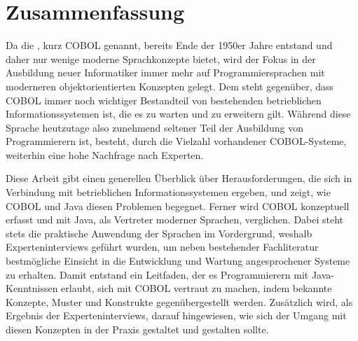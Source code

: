 \chapter*{Zusammenfassung} 

Da die , kurz \mbox{COBOL} genannt, bereits Ende der 1950er Jahre entstand und daher nur wenige moderne Sprachkonzepte bietet, wird der Fokus in der Ausbildung neuer Informatiker immer mehr auf Programmiersprachen mit moderneren objektorientierten Konzepten gelegt. Dem steht gegenüber, dass COBOL immer noch wichtiger Bestandteil von bestehenden betrieblichen Informationssystemen ist, die es zu warten und zu erweitern gilt. Während diese Sprache heutzutage also zunehmend seltener Teil der Ausbildung von Programmierern ist, besteht, durch die Vielzahl vorhandener COBOL-Systeme, weiterhin eine hohe Nachfrage nach Experten.

Diese Arbeit gibt einen generellen Überblick über Herausforderungen, die sich in Verbindung mit betrieblichen Informationssystemen ergeben, und zeigt, wie COBOL und Java diesen Problemen begegnet. Ferner wird COBOL konzeptuell erfasst und mit Java, als Vertreter moderner Sprachen, verglichen. Dabei steht stets die praktische Anwendung der Sprachen im Vordergrund, weshalb Experteninterviews geführt wurden, um neben bestehender Fachliteratur bestmögliche Einsicht in die Entwicklung und Wartung angesprochener Systeme zu erhalten. Damit entstand ein Leitfaden, der es Programmierern mit Java-Kenntnissen erlaubt, sich mit COBOL vertraut zu machen, indem bekannte Konzepte, Muster und Konstrukte gegenübergestellt werden. Zusätzlich wird, als Ergebnis der Experteninterviews, darauf hingewiesen, wie sich der Umgang mit diesen Konzepten in der Praxis gestaltet und gestalten sollte. 